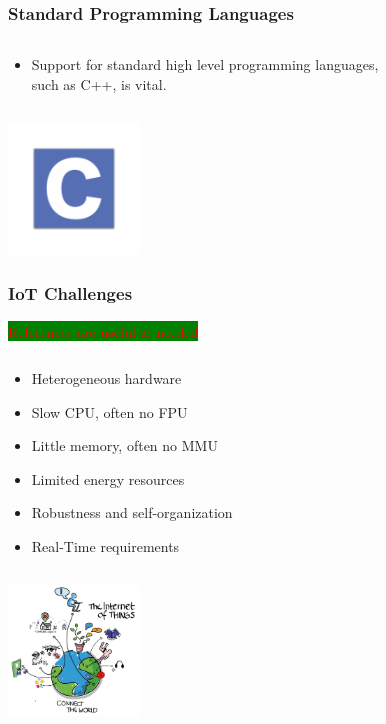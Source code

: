 \documentclass{beamer}
\begin{document}
\begin{frame}
	\frametitle{Standard Programming Languages}
	\begin{columns}[c]
		\begin{column}{30cm}
			\vspace{.1cm}
			\begin{itemize}
				\justifying
				\item Support for standard high level programming languages,\\
				such as C++, is vital.
			\end{itemize}
		\end{column}
	\end{columns}
	\vspace{1cm}
	\hspace*{7cm} \includegraphics[width=3.5cm]{figs/C.png}
\end{frame}

\begin{frame}
	\frametitle{IoT Challenges}
	\colorbox{green}{\textcolor{red}{References are useful \& needed}}	
	\begin{columns}[c]
		\begin{column}{30cm}
			\vspace{.1cm}
			\begin{itemize}
				\justifying
				\item Heterogeneous hardware
				\item Slow CPU, often no FPU
				\item Little memory, often no MMU
				\item Limited energy resources
				\item Robustness and self-organization
				\item Real-Time requirements
			\end{itemize}
		\end{column}
	\end{columns}
	\hspace*{7cm} \includegraphics[width=3.5cm]{figs/Internet-of-Things-3.jpg}
\end{frame}
\end{document}
